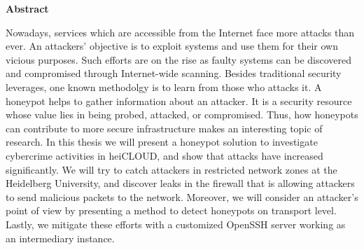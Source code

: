 \thispagestyle{empty}
\begin{center}
    \begin{minipage}[c][0.48\textheight][b]{0.9\textwidth}
        \small
        \begin{center}
            \textbf{Abstract}
        \end{center}\par
        \vspace{\baselineskip}
        Nowadays, services which are accessible from the Internet face more attacks than ever.
        An attackers' objective is to exploit systems and use them for their own vicious purposes.
        Such efforts are on the rise as faulty systems can be discovered and compromised through Internet-wide scanning.
        Besides traditional security leverages, one known methodolgy is to learn from those who attacks it.
        A honeypot helps to gather information about an attacker.
        It is a security resource whose value lies in being probed, attacked, or compromised.
        Thus, how honeypots can contribute to more secure infrastructure makes an interesting topic of research.
        In this thesis we will present a honeypot solution to investigate cybercrime activities in heiCLOUD, and show that attacks have increased significantly.
        We will try to catch attackers in restricted network zones at the Heidelberg University, and discover leaks in the firewall that is allowing attackers to send malicious packets to the network.
        Moreover, we will consider an attacker's point of view by presenting a method to detect honeypots on transport level.
        Lastly, we mitigate these efforts with a customized OpenSSH server working as an intermediary instance.
    \end{minipage}\par
    \vfill
\end{center}